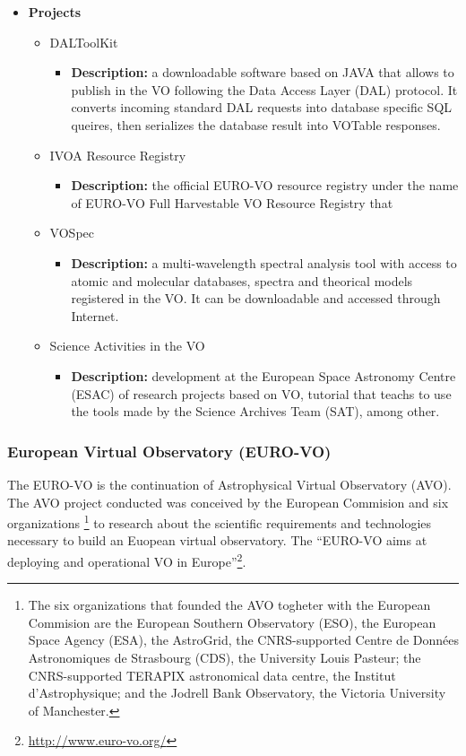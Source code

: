 \begin{itemize}
\item \textbf{Projects}
\begin{itemize}
\item DALToolKit
\begin{itemize}
\item \textbf{Description:} a downloadable software based on JAVA that allows to
publish in the VO following the Data Access Layer (DAL) protocol. It converts
incoming standard DAL requests into database specific SQL queires, then
serializes the database result into VOTable responses. 
\end{itemize}
\item IVOA Resource Registry
\begin{itemize}
\item \textbf{Description:} the official EURO-VO resource registry under the
name of EURO-VO Full Harvestable VO Resource Registry that 
\end{itemize}
\item VOSpec
\begin{itemize}
\item \textbf{Description:} a multi-wavelength spectral analysis tool with
access to atomic and molecular databases, spectra and theorical models
registered in the VO. It can be downloadable and accessed through Internet.
\end{itemize}
\item Science Activities in the VO
\begin{itemize}
\item \textbf{Description:} development at the European Space Astronomy Centre
(ESAC) of research projects based on VO, tutorial that teachs to use the tools
made by the Science Archives Team (SAT), among other.
\end{itemize}
\end{itemize}
\end{itemize}

\subsubsection{European Virtual Observatory (EURO-VO)}
The EURO-VO \cite{website:euro-vo-home} is the continuation of Astrophysical
Virtual Observatory (AVO). The AVO project conducted was conceived by the
European Commision and six organizations \footnote{The six organizations that
founded the AVO togheter with the European Commision are the European Southern
Observatory (ESO), the European Space Agency (ESA), the AstroGrid, the
CNRS-supported Centre de Données Astronomiques de Strasbourg (CDS), the
University Louis Pasteur; the CNRS-supported TERAPIX astronomical data centre,
the Institut d'Astrophysique; and the Jodrell Bank Observatory, the Victoria
University of Manchester.} to research about the scientific requirements and
technologies necessary to build an Euopean virtual observatory. The ``EURO-VO
aims at deploying and operational VO in
Europe''\footnote{\url{http://www.euro-vo.org/}}.\\

